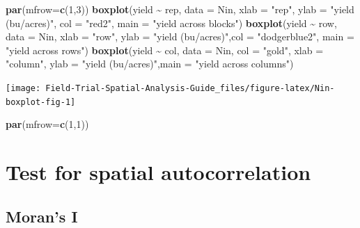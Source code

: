 \documentclass[
]{book}
\newenvironment{Shaded}{\begin{snugshade}}{\end{snugshade}}
\newcommand{\AttributeTok}[1]{\textcolor[rgb]{0.13,0.29,0.53}{#1}}
\newcommand{\DecValTok}[1]{\textcolor[rgb]{0.00,0.00,0.81}{#1}}
\newcommand{\FunctionTok}[1]{\textcolor[rgb]{0.13,0.29,0.53}{\textbf{#1}}}
\newcommand{\NormalTok}[1]{#1}
\newcommand{\SpecialCharTok}[1]{\textcolor[rgb]{0.81,0.36,0.00}{\textbf{#1}}}
\newcommand{\StringTok}[1]{\textcolor[rgb]{0.31,0.60,0.02}{#1}}
\begin{document}
\begin{Shaded}
\begin{Highlighting}[]
\FunctionTok{par}\NormalTok{(}\AttributeTok{mfrow=}\FunctionTok{c}\NormalTok{(}\DecValTok{1}\NormalTok{,}\DecValTok{3}\NormalTok{))}
\FunctionTok{boxplot}\NormalTok{(yield }\SpecialCharTok{\textasciitilde{}}\NormalTok{ rep, }\AttributeTok{data =}\NormalTok{ Nin, }\AttributeTok{xlab =} \StringTok{"rep"}\NormalTok{, }\AttributeTok{ylab =} \StringTok{"yield (bu/acres)"}\NormalTok{, }\AttributeTok{col =} \StringTok{"red2"}\NormalTok{, }\AttributeTok{main =} \StringTok{"yield across blocks"}\NormalTok{)}
\FunctionTok{boxplot}\NormalTok{(yield }\SpecialCharTok{\textasciitilde{}}\NormalTok{ row, }\AttributeTok{data =}\NormalTok{ Nin, }\AttributeTok{xlab =} \StringTok{"row"}\NormalTok{, }\AttributeTok{ylab =} \StringTok{"yield (bu/acres)"}\NormalTok{,}\AttributeTok{col =} \StringTok{"dodgerblue2"}\NormalTok{, }\AttributeTok{main =} \StringTok{"yield across rows"}\NormalTok{)}
\FunctionTok{boxplot}\NormalTok{(yield }\SpecialCharTok{\textasciitilde{}}\NormalTok{ col, }\AttributeTok{data =}\NormalTok{ Nin, }\AttributeTok{col =} \StringTok{"gold"}\NormalTok{, }\AttributeTok{xlab =} \StringTok{"column"}\NormalTok{, }\AttributeTok{ylab =} \StringTok{"yield (bu/acres)"}\NormalTok{,}\AttributeTok{main =} \StringTok{"yield across columns"}\NormalTok{)}
\end{Highlighting}
\end{Shaded}

\texttt{[image: Field-Trial-Spatial-Analysis-Guide\_files/figure-latex/Nin-boxplot-fig-1]}

\begin{Shaded}
\begin{Highlighting}[]
\FunctionTok{par}\NormalTok{(}\AttributeTok{mfrow=}\FunctionTok{c}\NormalTok{(}\DecValTok{1}\NormalTok{,}\DecValTok{1}\NormalTok{))}
\end{Highlighting}
\end{Shaded}

\hypertarget{test-for-spatial-autocorrelation}{%
\section{Test for spatial autocorrelation}\label{test-for-spatial-autocorrelation}}

\hypertarget{morans-i-1}{%
\subsection{Moran's I}\label{morans-i-1}}
\end{document}
